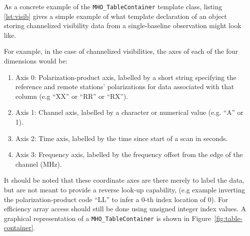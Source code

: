 As a concrete example of the \texttt{MHO\_TableContainer} template class, listing \ref{lst:visib} gives a simple example of what template declaration of an object storing channelized visibility data from a single-baseline observation might look like.

For example, in the case of channelized visibilities, the axes of each of the four dimensions would be:
\begin{enumerate}
\item Axis 0: Polarization-product axis, labelled by a short string specifying the reference
and remote stations' polarizations for data associated with that column (e.g ``XX'' or ``RR'' or ``RX'').
\item Axis 1: Channel axis, labelled by a character or numerical value (e.g. ``A'' or 1).
\item Axis 2: Time axis, labelled by the time since start of a scan in seconds.
\item Axis 3: Frequency axis, labelled by the frequency offset from the edge of the channel (MHz).
\end{enumerate}
It should be noted that these coordinate axes are there merely to label the data, but are not meant to provide a reverse look-up
capability, (e.g example inverting the polarization-product code ``LL'' to infer a 0-th index location of 0). For efficiency array
access should still be done using unsigned integer index values. A graphical representation of a \texttt{MHO\_TableContainer} is
shown in Figure~\ref{fig:table-container}.

